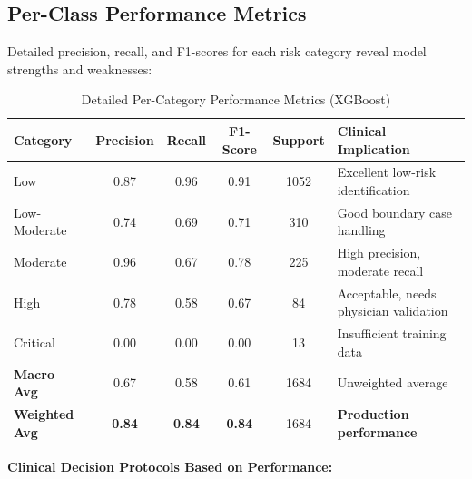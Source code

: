 \documentclass[3p,times,procedia]{elsarticle}
\begin{document}
\subsection{Per-Class Performance Metrics}
Detailed precision, recall, and F1-scores for each risk category reveal model strengths and weaknesses:

\begin{table}[!ht]
\centering
\caption{Detailed Per-Category Performance Metrics (XGBoost)}
\small
\begin{tabular}{|l|c|c|c|c|l|}
\hline
\rowcolor{gray!20}
\textbf{Category} & \textbf{Precision} & \textbf{Recall} & \textbf{F1-Score} & \textbf{Support} & \textbf{Clinical Implication} \\
\hline
Low & 0.87 & 0.96 & 0.91 & 1052 & Excellent low-risk identification \\
\rowcolor{gray!10}
Low-Moderate & 0.74 & 0.69 & 0.71 & 310 & Good boundary case handling \\
Moderate & 0.96 & 0.67 & 0.78 & 225 & High precision, moderate recall \\
\rowcolor{gray!10}
High & 0.78 & 0.58 & 0.67 & 84 & Acceptable, needs physician validation \\
Critical & 0.00 & 0.00 & 0.00 & 13 & Insufficient training data \\
\hline
\rowcolor{gray!20}
\textbf{Macro Avg} & 0.67 & 0.58 & 0.61 & 1684 & Unweighted average \\
\rowcolor{gray!20}
\textbf{Weighted Avg} & \textbf{0.84} & \textbf{0.84} & \textbf{0.84} & 1684 & \textbf{Production performance} \\
\hline
\end{tabular}
\end{table}


\textbf{Clinical Decision Protocols Based on Performance:}
\end{document}
